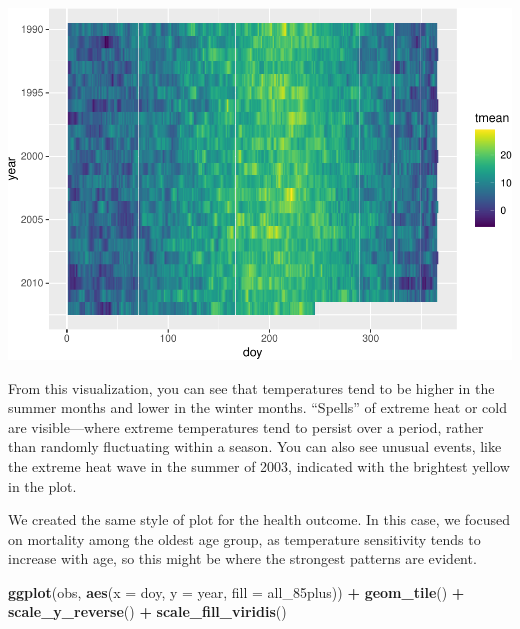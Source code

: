 \documentclass[
]{book}
\newenvironment{Shaded}{\begin{snugshade}}{\end{snugshade}}
\newcommand{\DataTypeTok}[1]{\textcolor[rgb]{0.13,0.29,0.53}{#1}}
\newcommand{\KeywordTok}[1]{\textcolor[rgb]{0.13,0.29,0.53}{\textbf{#1}}}
\newcommand{\NormalTok}[1]{#1}
\newcommand{\OperatorTok}[1]{\textcolor[rgb]{0.81,0.36,0.00}{\textbf{#1}}}
\newcommand{\StringTok}[1]{\textcolor[rgb]{0.31,0.60,0.02}{#1}}
\begin{document}
\includegraphics{adv_epi_analysis_files/figure-latex/unnamed-chunk-12-1.pdf}

From this visualization, you can see that temperatures tend to be higher in the
summer months and lower in the winter months. ``Spells'' of extreme heat or cold
are visible---where extreme temperatures tend to persist over a period, rather
than randomly fluctuating within a season. You can also see unusual events, like
the extreme heat wave in the summer of 2003, indicated with the brightest
yellow in the plot.

We created the same style of plot for the health outcome. In this case, we
focused on mortality among the oldest age group, as temperature sensitivity
tends to increase with age, so this might be where the strongest patterns are
evident.

\begin{Shaded}
\begin{Highlighting}[]
\KeywordTok{ggplot}\NormalTok{(obs, }\KeywordTok{aes}\NormalTok{(}\DataTypeTok{x =}\NormalTok{ doy, }\DataTypeTok{y =}\NormalTok{ year, }\DataTypeTok{fill =}\NormalTok{ all_85plus)) }\OperatorTok{+}\StringTok{ }
\StringTok{  }\KeywordTok{geom_tile}\NormalTok{() }\OperatorTok{+}
\StringTok{  }\KeywordTok{scale_y_reverse}\NormalTok{() }\OperatorTok{+}\StringTok{ }
\StringTok{  }\KeywordTok{scale_fill_viridis}\NormalTok{()}
\end{Highlighting}
\end{Shaded}
\end{document}
